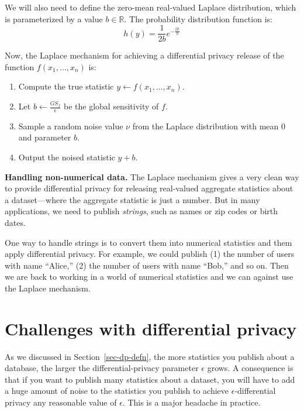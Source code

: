 \documentclass[
  letterpaper,
]{scrbook}
\providecommand{\tightlist}{%
  \setlength{\itemsep}{0pt}\setlength{\parskip}{0pt}}
\newcommand{\R}{\mathbb{R}}
\newcommand{\abs}[1]{\left| #1 \right|}
\theoremstyle{definition}
\theoremstyle{plain}
\theoremstyle{plain}
\theoremstyle{remark}
\begin{document}
We will also need to define the zero-mean real-valued Laplace
distribution, which is parameterized by a value \(b \in \R\). The
probability distribution function is:
\[ h(y) = \frac{1}{2b} e^{-\frac{\abs{y}}{b}} \]

Now, the Laplace mechanism for achieving a differential privacy release
of the function \(f(x_1, \dots, x_n)\) is:

\begin{enumerate}
\def\labelenumi{\arabic{enumi}.}
\tightlist
\item
  Compute the true statistic \(y \gets f(x_1, \dots, x_n)\).
\item
  Let \(b \gets \frac{GS_f}{\epsilon}\) be the global sensitivity of
  \(f\).
\item
  Sample a random noise value \(\nu\) from the Laplace distribution with
  mean \(0\) and parameter \(b\).
\item
  Output the noised statistic \(y + b\).
\end{enumerate}

\textbf{Handling non-numerical data.} The Laplace mechanism gives a very
clean way to provide differential privacy for releasing real-valued
aggregate statistics about a dataset---where the aggregate statistic is
just a number. But in many applications, we need to publish
\emph{strings}, such as names or zip codes or birth dates.

One way to handle strings is to convert them into numerical statistics
and them apply differential privacy. For example, we could publish (1)
the number of users with name ``Alice,'' (2) the number of users with
name ``Bob,'' and so on. Then we are back to working in a world of
numerical statistics and we can against use the Laplace mechanism.

\section{Challenges with differential
privacy}\label{challenges-with-differential-privacy}

As we discussed in Section~\ref{sec-dp-defn}, the more statistics you
publish about a database, the larger the differential-privacy parameter
\(\epsilon\) grows. A consequence is that if you want to publish many
statistics about a dataset, you will have to add a huge amount of noise
to the statistics you publish to achieve \(\epsilon\)-differential
privacy any reasonable value of \(\epsilon\). This is a major headache
in practice.
\end{document}
